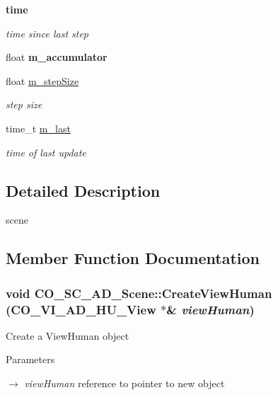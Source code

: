 \begin{Indent}{\bf time}\par
{\em \label{_amgrp07cc694b9b3fc636710fa08b6922c42b}
 time since last step }\begin{DoxyCompactItemize}
\item 
\hypertarget{classContent_1_1Scene_1_1Admin_1_1Scene_a575bd69394d17e05da0a0bf72a1b5e33}{
float {\bfseries m\_\-accumulator}}
\label{classContent_1_1Scene_1_1Admin_1_1Scene_a575bd69394d17e05da0a0bf72a1b5e33}

\item 
\hypertarget{classContent_1_1Scene_1_1Admin_1_1Scene_a4aa156782cebc8c7ac35f421ca4f2a59}{
float \hyperlink{classContent_1_1Scene_1_1Admin_1_1Scene_a4aa156782cebc8c7ac35f421ca4f2a59}{m\_\-stepSize}}
\label{classContent_1_1Scene_1_1Admin_1_1Scene_a4aa156782cebc8c7ac35f421ca4f2a59}

\begin{DoxyCompactList}\small\item\em step size \item\end{DoxyCompactList}\item 
\hypertarget{classContent_1_1Scene_1_1Admin_1_1Scene_a880a5b034e684f7cf2750e26897a189c}{
time\_\-t \hyperlink{classContent_1_1Scene_1_1Admin_1_1Scene_a880a5b034e684f7cf2750e26897a189c}{m\_\-last}}
\label{classContent_1_1Scene_1_1Admin_1_1Scene_a880a5b034e684f7cf2750e26897a189c}

\begin{DoxyCompactList}\small\item\em time of last update \item\end{DoxyCompactList}\end{DoxyCompactItemize}
\end{Indent}


\subsection{Detailed Description}
scene 

\subsection{Member Function Documentation}
\hypertarget{classContent_1_1Scene_1_1Admin_1_1Scene_a2ff8b2787231305b94b63a6d698eeea7}{
\subsubsection[{CreateViewHuman}]{\setlength{\rightskip}{0pt plus 5cm}void CO\_\-SC\_\-AD\_\-Scene::CreateViewHuman ({\bf CO\_\-VI\_\-AD\_\-HU\_\-View} $\ast$\& {\em viewHuman})}}
\label{classContent_1_1Scene_1_1Admin_1_1Scene_a2ff8b2787231305b94b63a6d698eeea7}
Create a ViewHuman object 
\begin{DoxyParams}{Parameters}
\item[\mbox{$\rightarrow$} {\em viewHuman}]reference to pointer to new object \end{DoxyParams}


